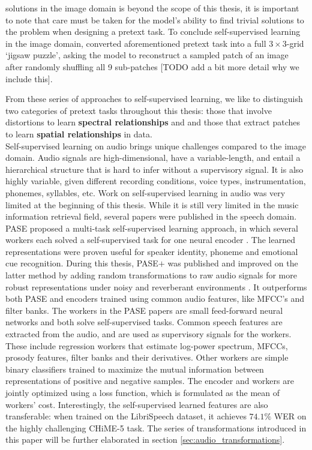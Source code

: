 solutions in the image domain is beyond the scope of this thesis, it is important to note that care must be taken for the model's ability to find trivial solutions to the problem when designing a pretext task. %
To conclude self-supervised learning in the image domain, \cite{noroozi_unsupervised_2016} converted aforementioned pretext task into a full $3\times 3$-grid `jigsaw puzzle', asking the model to reconstruct a sampled patch of an image after randomly shuffling all 9 sub-patches [TODO add a bit more detail why we include this].

From these series of approaches to self-supervised learning, we like to distinguish two categories of pretext tasks throughout this thesis: those that involve distortions to learn \textbf{spectral relationships} and and those that extract patches to learn \textbf{spatial relationships} in data. \\


Self-supervised learning on audio brings unique challenges compared to the image domain. Audio signals are high-dimensional, have a variable-length, and entail a hierarchical structure that is hard to infer without a supervisory signal. It is also highly variable, given different recording conditions, voice types, instrumentation, phonemes, syllables, etc. Work on self-supervised learning in audio was very limited at the beginning of this thesis. While it is still very limited in the music information retrieval field, several papers were published in the speech domain. PASE proposed a multi-task self-supervised learning approach, in which several workers each solved a self-supervised task for one neural encoder \cite{Pascual2019}. The learned representations were proven useful for speaker identity, phoneme and emotional cue recognition. During this thesis, PASE$+$ was published and improved on the latter method by adding random transformations to raw audio signals for more robust representations under noisy and reverberant environments \cite{Ravanelli2020}. It outperforms both PASE and encoders trained using common audio features, like MFCC's and filter banks. The workers in the PASE papers are small feed-forward neural networks and both solve self-supervised tasks. Common speech features are extracted from the audio, and are used as supervisory signals for the workers. These include regression workers that estimate log-power spectrum, MFCCs, prosody features, filter banks and their derivatives. Other workers are simple binary classifiers trained to maximize the mutual information between representations of positive and negative samples. The encoder and workers are jointly optimized using a loss function, which is formulated as the mean of workers' cost. Interestingly, the self-supervised learned features are also transferable: when trained on the LibriSpeech dataset, it achieves $74.1\%$ WER on the highly challenging CHiME-5 task\cite{barker2018fifth}. The series of transformations introduced in this paper will be further elaborated in section \ref{sec:audio_transformations}.

